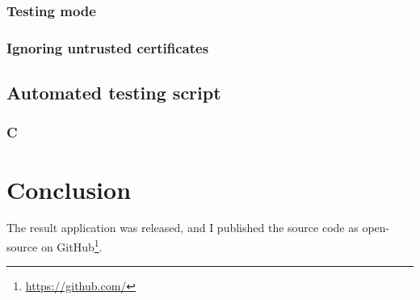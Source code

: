 \subsection{Testing mode}

\subsection{Ignoring untrusted certificates}
\label{ignorecerts}

\section{Automated testing script}

\subsection{C}

\chapter{Conclusion}
\label{ch_conclusion}

The result application was released, and I published the source code as open-source on GitHub\footnote{\url{https://github.com/}}.

